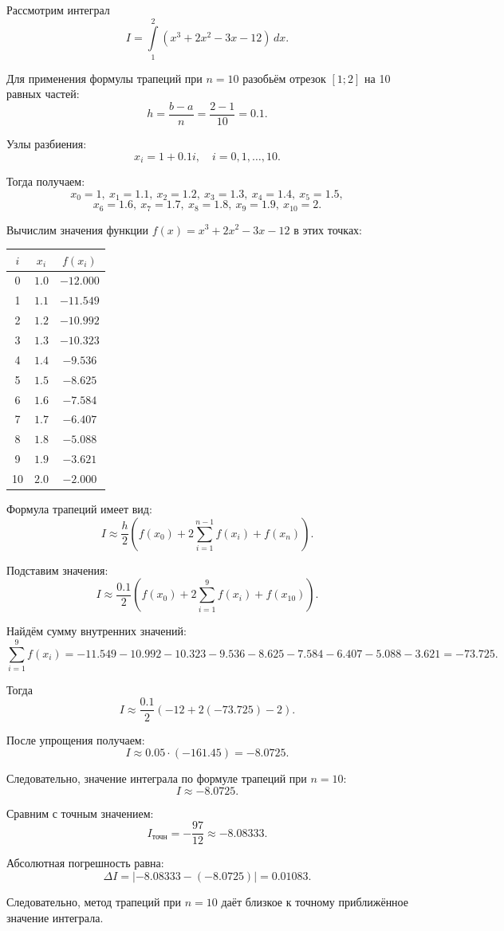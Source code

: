 \documentclass[12pt]{report}
\begin{document}
	\begin{flushleft}
		Рассмотрим интеграл
		\[
		I=\int\limits_{1}^{2}(x^3+2x^2-3x-12)\,dx.
		\]
		
		Для применения формулы трапеций при $n=10$ разобьём отрезок $[1;2]$ на 10 равных частей:
		\[
		h=\frac{b-a}{n}=\frac{2-1}{10}=0.1.
		\]
		
		Узлы разбиения:
		\[
		x_i=1+0.1i,\quad i=0,1,\dots,10.
		\]
		
		Тогда получаем:
		\[
		x_0=1,\ x_1=1.1,\ x_2=1.2,\ x_3=1.3,\ x_4=1.4,\ x_5=1.5,
		\]
		\[
		x_6=1.6,\ x_7=1.7,\ x_8=1.8,\ x_9=1.9,\ x_{10}=2.
		\]
		
		Вычислим значения функции $f(x)=x^3+2x^2-3x-12$ в этих точках:
		
		\begin{center}
			\begin{tabular}{|c|c|c|}
				\hline
				$i$ & $x_i$ & $f(x_i)$ \\
				\hline
				0 & $1.0$ & $-12.000$ \\
				\hline
				1 & $1.1$ & $-11.549$ \\
				\hline
				2 & $1.2$ & $-10.992$ \\
				\hline
				3 & $1.3$ & $-10.323$ \\
				\hline
				4 & $1.4$ & $-9.536$ \\
				\hline
				5 & $1.5$ & $-8.625$ \\
				\hline
				6 & $1.6$ & $-7.584$ \\
				\hline
				7 & $1.7$ & $-6.407$ \\
				\hline
				8 & $1.8$ & $-5.088$ \\
				\hline
				9 & $1.9$ & $-3.621$ \\
				\hline
				10 & $2.0$ & $-2.000$ \\
				\hline
			\end{tabular}
		\end{center}
		
		Формула трапеций имеет вид:
		\[
		I \approx \frac{h}{2}\left(f(x_0)+2\sum_{i=1}^{n-1}f(x_i)+f(x_n)\right).
		\]
		
		Подставим значения:
		\[
		I \approx \frac{0.1}{2}\left(f(x_0)+2\sum_{i=1}^{9}f(x_i)+f(x_{10})\right).
		\]
		
		Найдём сумму внутренних значений:
		\[
		\sum_{i=1}^{9}f(x_i)= -11.549-10.992-10.323-9.536-8.625-7.584-6.407-5.088-3.621=-73.725.
		\]
		
		Тогда
		\[
		I \approx \frac{0.1}{2}\left(-12+2(-73.725)-2\right).
		\]
		
		После упрощения получаем:
		\[
		I \approx 0.05\cdot(-161.45)=-8.0725.
		\]
		
		Следовательно, значение интеграла по формуле трапеций при $n=10$:
		\[
		\boxed{I\approx -8.0725.}
		\]
		
		Сравним с точным значением:
		\[
		I_{\text{точн}}=-\frac{97}{12}\approx -8.08333.
		\]
		
		Абсолютная погрешность равна:
		\[
		\Delta I=\left|-8.08333-(-8.0725)\right|=0.01083.
		\]
		
		Следовательно, метод трапеций при $n=10$ даёт близкое к точному приближённое значение интеграла.
	\end{flushleft}
	
\end{document}
